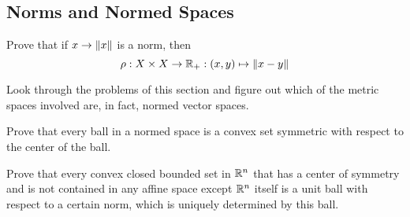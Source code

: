 \subsection{Norms and Normed Spaces}

\begin{minorEx}%
    Prove that if $x \to \Vert x\Vert$ is a norm, then
    \[
        \rho : X \times X \to \mathbb{R}_+ : (x,y) \mapsto \Vert x - y\Vert
    \]
\end{minorEx}

\begin{minorEx}
    Look through the problems of this section and figure out which of the metric
    spaces involved are, in fact, normed vector spaces.
\end{minorEx}

\begin{minorEx}
    Prove that every ball in a normed space is a convex set symmetric with
    respect to the center of the ball.
\end{minorEx}

\begin{minorEx}
    Prove that every convex closed bounded set in $\mathbb{R}^n$ that has a center of
    symmetry and is not contained in any affine space except $\mathbb{R}^n$ itself is a
    unit ball with respect to a certain norm, which is uniquely determined by
    this ball.
\end{minorEx}
